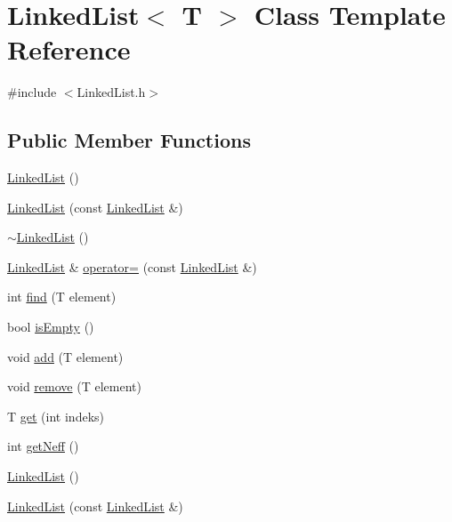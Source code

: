 \hypertarget{classLinkedList}{}\section{Linked\+List$<$ T $>$ Class Template Reference}
\label{classLinkedList}


{\ttfamily \#include $<$Linked\+List.\+h$>$}

\subsection*{Public Member Functions}
\begin{DoxyCompactItemize}
\item 
\mbox{\hyperlink{classLinkedList_a3c20fcfec867e867f541061a09fc640c}{Linked\+List}} ()
\item 
\mbox{\hyperlink{classLinkedList_af82224d7ec3e1a5779e9385bf058b6b5}{Linked\+List}} (const \mbox{\hyperlink{classLinkedList}{Linked\+List}} \&)
\item 
\mbox{\hyperlink{classLinkedList_a7c37609df3b83bc4eb0281b852f93fd7}{$\sim$\+Linked\+List}} ()
\item 
\mbox{\hyperlink{classLinkedList}{Linked\+List}} \& \mbox{\hyperlink{classLinkedList_ab18fc44ff270a0ff32e6d13c5cb75fc5}{operator=}} (const \mbox{\hyperlink{classLinkedList}{Linked\+List}} \&)
\item 
int \mbox{\hyperlink{classLinkedList_a924e217dd525b84492e9f0dc61db96bc}{find}} (T element)
\item 
bool \mbox{\hyperlink{classLinkedList_a7ecbb28e82117a680839ed0dc28ebdce}{is\+Empty}} ()
\item 
void \mbox{\hyperlink{classLinkedList_ab7364799e5965dd59d4f5952cb953287}{add}} (T element)
\item 
void \mbox{\hyperlink{classLinkedList_a6c4973ae9956ddb037a9093cffa2adb1}{remove}} (T element)
\item 
T \mbox{\hyperlink{classLinkedList_a0f812c8aa5443a800c4e3c4bcb5542fa}{get}} (int indeks)
\item 
int \mbox{\hyperlink{classLinkedList_a0f1bf5709295784ae18271b88af50f88}{get\+Neff}} ()
\item 
\mbox{\hyperlink{classLinkedList_a3c20fcfec867e867f541061a09fc640c}{Linked\+List}} ()
\item 
\mbox{\hyperlink{classLinkedList_af82224d7ec3e1a5779e9385bf058b6b5}{Linked\+List}} (const \mbox{\hyperlink{classLinkedList}{Linked\+List}} \&)
\item 

\end{DoxyCompactItemize}
